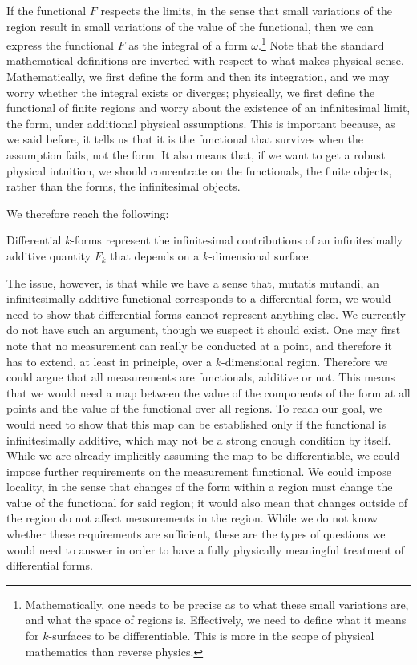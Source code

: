 If the functional $F$ respects the limits, in the sense that small variations of the region result in small variations of the value of the functional, then we can express the functional $F$ as the integral of a form $\omega$.\footnote{Mathematically, one needs to be precise as to what these small variations are, and what the space of regions is. Effectively, we need to define what it means for $k$-surfaces to be differentiable. This is more in the scope of physical mathematics than reverse physics.} Note that the standard mathematical definitions are inverted with respect to what makes physical sense. Mathematically, we first define the form and then its integration, and we may worry whether the integral exists or diverges; physically, we first define the functional of finite regions and worry about the existence of an infinitesimal limit, the form, under additional physical assumptions. This is important because, as we said before, it tells us that it is the functional that survives when the assumption fails, not the form. It also means that, if we want to get a robust physical intuition, we should concentrate on the functionals, the finite objects, rather than the forms, the infinitesimal objects.

We therefore reach the following:
\begin{insight}
	Differential $k$-forms represent the infinitesimal contributions of an infinitesimally additive quantity $F_k$ that depends on a $k$-dimensional surface.
\end{insight}
The issue, however, is that while we have a sense that, mutatis mutandi, an infinitesimally additive functional corresponds to a differential form, we would need to show that differential forms cannot represent anything else. We currently do not have such an argument, though we suspect it should exist. One may first note that no measurement can really be conducted at a point, and therefore it has to extend, at least in principle, over a $k$-dimensional region. Therefore we could argue that all measurements are functionals, additive or not. This means that we would need a map between the value of the components of the form at all points and the value of the functional over all regions. To reach our goal, we would need to show that this map can be established only if the functional is infinitesimally additive, which may not be a strong enough condition by itself. While we are already implicitly assuming the map to be differentiable, we could impose further requirements on the measurement functional. We could impose locality, in the sense that changes of the form within a region must change the value of the functional for said region; it would also mean that changes outside of the region do not affect measurements in the region. While we do not know whether these requirements are sufficient, these are the types of questions we would need to answer in order to have a fully physically meaningful treatment of differential forms.

